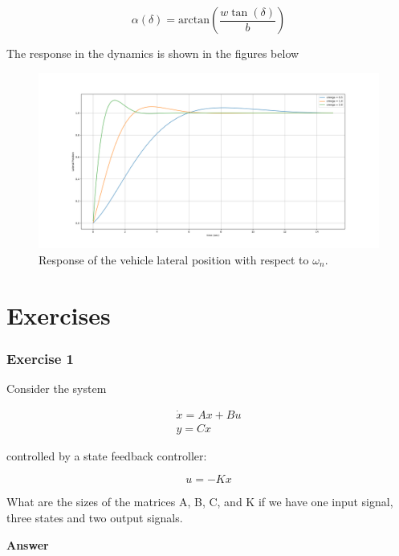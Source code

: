 \begin{equation}
\alpha(\delta) = \text{arctan}(\frac{w\tan(\delta)}{b})
\end{equation}


The response in the dynamics is shown in the figures below

\begin{figure}[!htb]
\begin{center}
\includegraphics[scale=0.280]{img/state_feedback/lateral_position_response.png}
\end{center}
\caption{Response of the vehicle lateral position with respect to $\omega_n$.}
\label{lateral_position_response}
\end{figure}

\section{Exercises}

\subsubsection{Exercise 1}

Consider the system 

\begin{eqnarray}
\dot{x} = Ax + Bu \\
y = Cx 
\end{eqnarray}

controlled by a state feedback controller: 

\begin{equation}
 u = -Kx  
\end{equation}

What are  the sizes of the matrices A, B, C, and K if we have one input signal, three states and two output signals.

\textbf{Answer}

